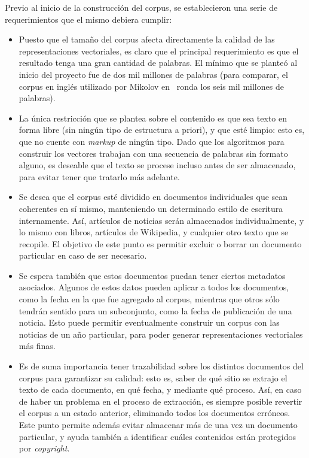 Previo al inicio de la construcción del corpus, se establecieron una serie de requerimientos que el
mismo debiera cumplir:

\begin{itemize}

\item Puesto que el tamaño del corpus afecta directamente la calidad de las representaciones
vectoriales, es claro que el principal requerimiento es que el resultado tenga una gran cantidad de
palabras. El mínimo que se planteó al inicio del proyecto fue de dos mil millones de palabras (para
comparar, el corpus en inglés utilizado por Mikolov en~\cite{Mikolov2013c} ronda los seis mil
millones de palabras).

\item La única restricción que se plantea sobre el contenido es que sea texto en forma libre (sin
ningún tipo de estructura a priori), y que esté limpio: esto es, que no cuente con \textit{markup}
de ningún tipo. Dado que los algoritmos para construir los vectores trabajan con una secuencia de
palabras sin formato alguno, es deseable que el texto se procese incluso antes de ser almacenado,
para evitar tener que tratarlo más adelante.

\item Se desea que el corpus esté dividido en documentos individuales que sean coherentes en sí
mismo, manteniendo un determinado estilo de escritura internamente. Así, artículos de noticias serán
almacenados individualmente, y lo mismo con libros, artículos de Wikipedia, y cualquier otro texto
que se recopile. El objetivo de este punto es permitir excluir o borrar un documento particular en
caso de ser necesario.

\item Se espera también que estos documentos puedan tener ciertos metadatos asociados. Algunos de
estos datos pueden aplicar a todos los documentos, como la fecha en la que fue agregado al corpus,
mientras que otros sólo tendrán sentido para un subconjunto, como la fecha de publicación de una
noticia. Esto puede permitir eventualmente construir un corpus con las noticias de un año
particular, para poder generar representaciones vectoriales más finas.

\item Es de suma importancia tener trazabilidad sobre los distintos documentos del corpus para
garantizar su calidad: esto es, saber de qué sitio se extrajo el texto de cada documento, en qué
fecha, y mediante qué proceso. Así, en caso de haber un problema en el proceso de extracción, es
siempre posible revertir el corpus a un estado anterior, eliminando todos los documentos
erróneos. Este punto permite además evitar almacenar más de una vez un documento particular, y ayuda
también a identificar cuáles contenidos están protegidos por \textit{copyright}.


\end{itemize}
